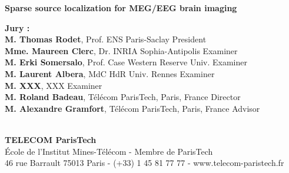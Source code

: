 \documentclass[12pt,a4paper,english]{MastersDoctoralThesis}
\begin{document}
\begin{center}
%
%
%
\vspace{1.cm}%
%
%
%
\begin{spacing}{3.0}
\textcolor[RGB]{191,18,56}{
\noindent
{\Huge{\bf Sparse source localization for MEG/EEG brain imaging}}\\
}
\end{spacing}
%
%
\vspace{2.cm}%
%
%
%
\end{center}
%
%
%
\vspace{-1.2cm}
%
%
%
\flushleft
\hspace{-1.7cm}
\begin{minipage}{1.05\textwidth}	%
{\bf Jury :}\vspace{0.2cm}\\
{\bf M. Thomas Rodet}, {\small Prof. ENS Paris-Saclay}
\hfill President\vspace{0.2cm}\\
{\bf Mme. Maureen Clerc}, {\small Dr. INRIA Sophia-Antipolis}
\hfill Examiner\\
{\bf M. Erki Somersalo}, {\small Prof. Case Western Reserve Univ.}
\hfill Examiner\\%
{\bf M. Laurent Albera}, {\small MdC HdR Univ. Rennes}
\hfill Examiner\\
{\bf M. XXX}, {\small XXX}
\hfill Examiner\vspace{0.2cm}\\
{\bf M. Roland Badeau}, {\small T\'el\'ecom ParisTech, Paris, France}
\hfill Director\\
{\bf M. Alexandre Gramfort}, {\small T\'el\'ecom ParisTech, Paris, France}
\hfill Advisor\\
\end{minipage}\\
%
%
%
\vspace{.8cm}
%
%
%
\centering
{\bf TELECOM ParisTech}\\
{\small École de l'Institut Mines-Télécom - Membre de ParisTech}\\
{\tiny 46 rue Barrault 75013 Paris - (+33) 1 45 81 77 77 - www.telecom-paristech.fr}
%
%
%
\newpage
\end{document}
